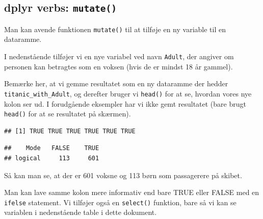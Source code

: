\documentclass[
]{book}
\newenvironment{Shaded}{\begin{snugshade}}{\end{snugshade}}
\newcommand{\AttributeTok}[1]{\textcolor[rgb]{0.77,0.63,0.00}{#1}}
\newcommand{\DecValTok}[1]{\textcolor[rgb]{0.00,0.00,0.81}{#1}}
\newcommand{\FunctionTok}[1]{\textcolor[rgb]{0.00,0.00,0.00}{#1}}
\newcommand{\NormalTok}[1]{#1}
\newcommand{\OtherTok}[1]{\textcolor[rgb]{0.56,0.35,0.01}{#1}}
\newcommand{\SpecialCharTok}[1]{\textcolor[rgb]{0.00,0.00,0.00}{#1}}
\begin{document}
\hypertarget{dplyr-verbs-mutate}{%
\subsection{\texorpdfstring{dplyr verbs: \texttt{mutate()}}{dplyr verbs: mutate()}}\label{dplyr-verbs-mutate}}

Man kan avende funktionen \texttt{mutate()} til at tilføje en ny variable til en dataramme.

I nedenstående tilføjer vi en nye variabel ved navn \texttt{Adult}, der angiver om personen kan betragtes som en voksen (hvis de er mindst 18 år gammel).

Bemærke her, at vi gemme resultatet som en ny dataramme der hedder \texttt{titanic\_with\_Adult}, og derefter bruger vi \texttt{head()} for at se, hvordan vores nye kolon ser ud. I forudgående eksempler har vi ikke gemt resultatet (bare brugt \texttt{head()} for at se resultatet på skærmen).

\begin{Shaded}
\end{Shaded}

\begin{verbatim}
## [1] TRUE TRUE TRUE TRUE TRUE TRUE
\end{verbatim}

\begin{Shaded}
\end{Shaded}

\begin{verbatim}
##    Mode   FALSE    TRUE 
## logical     113     601
\end{verbatim}

Så kan man se, at der er 601 voksne og 113 børn som passagerere på skibet.

Man kan lave samme kolon mere informativ end bare TRUE eller FALSE med en \texttt{ifelse} statement. Vi tilføjer også en \texttt{select()} funktion, bare så vi kan se variablen i nedenstående table i dette dokument.
\end{document}

